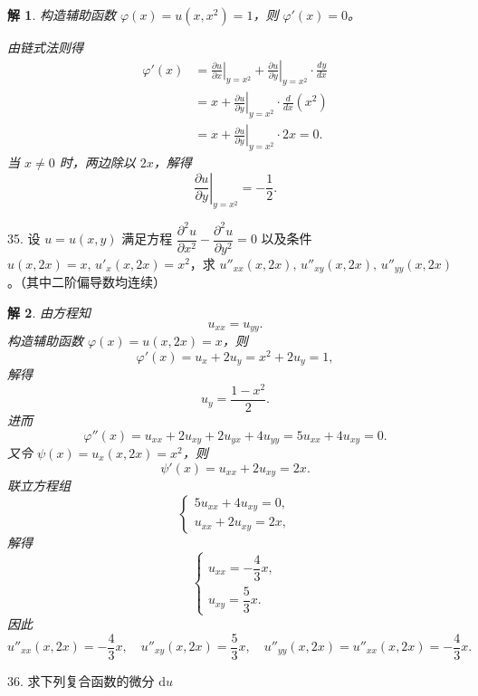 \documentclass[a4paper,12pt]{article}
\newtheorem*{sol}{解}
\begin{document}
\begin{sol}
    构造辅助函数 $\varphi(x) = u(x,x^2) = 1$，则 $\varphi'(x) = 0$。

    由链式法则得
    $$
        \begin{aligned}
            \varphi'(x) & = \left.\frac{\partial u}{\partial x}\right|_{y=x^2} + \left.\frac{\partial u}{\partial y}\right|_{y=x^2} \cdot \frac{dy}{dx} \\
                        & = x + \left.\frac{\partial u}{\partial y}\right|_{y=x^2} \cdot \frac{d}{dx}(x^2)                                              \\
                        & = x + \left.\frac{\partial u}{\partial y}\right|_{y=x^2} \cdot 2x = 0.
        \end{aligned}
    $$
    当 $x \neq 0$ 时，两边除以 $2x$，解得
    $$
        \left.\frac{\partial u}{\partial y}\right|_{y=x^2} = -\frac{1}{2}.
    $$
\end{sol}

35. 设 $u = u(x,y)$ 满足方程 $\dfrac{\partial^2 u}{\partial x^2} - \dfrac{\partial^2 u}{\partial y^2} = 0$ 以及条件 $u(x,2x) = x,\,u'_x(x,2x) = x^2$，求 $u''_{xx}(x,2x),\,u''_{xy}(x,2x),\,u''_{yy}(x,2x)$。（其中二阶偏导数均连续）

\begin{sol}
    由方程知
    $$
        u_{xx} = u_{yy}.
    $$
    构造辅助函数 $\varphi(x) = u(x,2x) = x$，则
    $$
        \varphi'(x) = u_x + 2u_y = x^2 + 2u_y = 1,
    $$
    解得
    $$
        u_y = \frac{1 - x^2}{2}.
    $$
    进而
    $$
        \varphi''(x) = u_{xx} + 2u_{xy} + 2u_{yx} + 4u_{yy} = 5u_{xx} + 4u_{xy} = 0.
    $$
    又令 $\psi(x) = u_x(x,2x) = x^2$，则
    $$
        \psi'(x) = u_{xx} + 2u_{xy} = 2x.
    $$
    联立方程组
    $$
        \begin{cases}
            5u_{xx} + 4u_{xy} = 0, \\
            u_{xx} + 2u_{xy} = 2x,
        \end{cases}
    $$
    解得
    $$
        \begin{cases}
            u_{xx} = -\dfrac{4}{3}x, \\[6pt]
            u_{xy} = \dfrac{5}{3}x.
        \end{cases}
    $$
    因此
    $$
        u''_{xx}(x,2x) = -\frac{4}{3}x,\quad u''_{xy}(x,2x) = \frac{5}{3}x,\quad u''_{yy}(x,2x) = u''_{xx}(x,2x) = -\frac{4}{3}x.
    $$
\end{sol}

36. 求下列复合函数的微分 $\mathrm{d}u$
\end{document}
